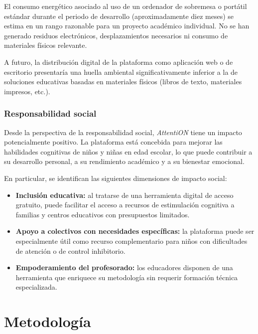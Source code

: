 \documentclass[12pt, a4paper]{report}
\begin{document}
El consumo energético asociado al uso de un ordenador de sobremesa o portátil
estándar durante el periodo de desarrollo (aproximadamente diez meses) se
estima en un rango razonable para un proyecto académico individual. No se han
generado residuos electrónicos, desplazamientos necesarios ni consumo de
materiales físicos relevante.

A futuro, la distribución digital de la plataforma como aplicación web o
de escritorio presentaría una huella ambiental significativamente inferior
a la de soluciones educativas basadas en materiales físicos (libros de texto,
materiales impresos, etc.).

\subsection{Responsabilidad social}

Desde la perspectiva de la responsabilidad social, \textit{AttentiON} tiene
un impacto potencialmente positivo. La plataforma está concebida para mejorar
las habilidades cognitivas de niños y niñas en edad escolar, lo que puede
contribuir a su desarrollo personal, a su rendimiento académico y a su
bienestar emocional.

En particular, se identifican las siguientes dimensiones de impacto social:

\begin{itemize}
  \item \textbf{Inclusión educativa:} al tratarse de una herramienta digital
    de acceso gratuito, puede facilitar el acceso a recursos de estimulación
    cognitiva a familias y centros educativos con presupuestos limitados.
  \item \textbf{Apoyo a colectivos con necesidades específicas:} la plataforma
    puede ser especialmente útil como recurso complementario para niños con
    dificultades de atención o de control inhibitorio.
  \item \textbf{Empoderamiento del profesorado:} los educadores disponen de
    una herramienta que enriquece su metodología sin requerir formación
    técnica especializada.
\end{itemize}

\chapter{Metodología}
\end{document}
